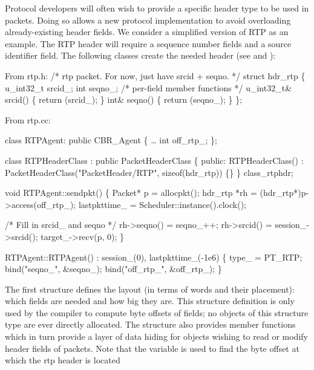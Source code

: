 Protocol developers
will often wish to provide a specific header type to be used in packets.
Doing so allows a new protocol implementation
to avoid overloading already-existing header fields.
We consider a simplified version of RTP as an example.
The RTP header will require a sequence number fields and a source
identifier field.
The following classes create the needed header
(see  and ):
\begin{program}
{\rm From rtp.h:}
        /* {\cf rtp packet.  For now, just have srcid + seqno.} */
        struct hdr_rtp \{ 
                u_int32_t srcid_;
                int seqno_;
                /* {\cf per-field member functions } */
                u_int32_t& srcid() \{ return (srcid_); \}
                int& seqno() \{ return (seqno_); \}
        \};

{\rm From rtp.cc:}

        class RTPAgent: public CBR_Agent \{
                \ldots
                int off_rtp_;
        \};

        class RTPHeaderClass : public PacketHeaderClass \{
        public: 
                RTPHeaderClass() : PacketHeaderClass("PacketHeader/RTP",
                                                     sizeof(hdr_rtp)) \{\}
        \} class_rtphdr;

        void RTPAgent::sendpkt()
        \{
                Packet* p = allocpkt();
                hdr_rtp *rh = (hdr_rtp*)p->access(off_rtp_);
                lastpkttime_ = Scheduler::instance().clock();

                /* {\cf Fill in srcid_ and seqno} */
                rh->seqno() = seqno_++;
                rh->srcid() = session_->srcid();
                target_->recv(p, 0);
        \}

        RTPAgent::RTPAgent()
                : session_(0), lastpkttime_(-1e6)
        \{
                type_ = PT_RTP;
                bind("seqno_", &seqno_);
                bind("off_rtp_", &off_rtp_);
        \}
\end{program}
The first structure defines the layout
(in terms of words and their placement):
which fields are needed and how big they are.
This structure definition is only used by the
compiler to compute byte offsets of fields;
no objects of this structure type are ever directly allocated.
The structure also provides member functions which in turn
provide a layer of data hiding for objects wishing to read
or modify header fields of packets.
Note that the variable  is used
to find the byte offset at which the rtp header is located
